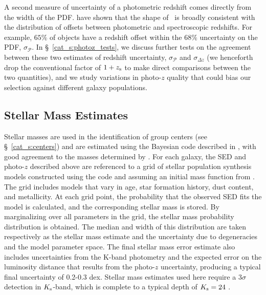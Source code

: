 A second measure of uncertainty of a photometric redshift comes
directly from the width of the PDF. \citet{Ilbert2009} have shown
that the shape of \pz\ is broadly consistent with the distribution of
offsets between photometric and spectroscopic redshifts. For example,
$65\%$ of objects have a redshift offset within the $68\%$ uncertainty
on the PDF, $\sigma_{\mathcal{P}}$. In \S~\ref{cat_s:photoz_tests}, we
discuss further tests on the agreement between these two estimates of
redshift uncertainty, $\sigma_{\mathcal{P}}$ and $\sigma_{\Delta z}$ (we
henceforth drop the conventional factor of $1+\mbox{$z_{\rm s}$}$ to make direct
comparisons between the two quantities), and we study variations in
photo-$z$ quality that could bias our selection against different
galaxy populations.

\subsection{Stellar Mass Estimates}
\label{cat_s:stellarmass}

Stellar masses are used in the identification of group centers (see
\S~\ref{cat_s:centers}) and are estimated using the Bayesian code
described in \citet{Bundy2006a}, with good agreement to the
masses determined by \citet{Drory2009}. For each galaxy, the SED and
photo-$z$ described above are referenced to a grid of stellar population
synthesis models constructed using the \citet{Bruzual2003} code and
assuming an initial mass function from \citet{Chabrier2003}.  The
grid includes models that vary in age, star formation history, dust
content, and metallicity.  At each grid point, the probability that
the observed SED fits the model is calculated, and the corresponding
stellar mass is stored. 
By marginalizing over all parameters in the grid, the stellar mass
probability distribution is obtained.  The median and width of this
distribution are taken respectively as the stellar mass estimate and
the uncertainty due to degeneracies and the model parameter space.
The final stellar mass error estimate also includes uncertainties from
the K-band photometry and the expected error on the luminosity
distance that results from the photo-$z$ uncertainty, producing a typical
final uncertainty of 0.2-0.3 dex. Stellar mass estimates used here
require a $3\sigma$ detection in $K_{\rm s}$-band, which
is complete to a typical depth of $K_{\rm s}=24$ \citep{McCracken2010}.



